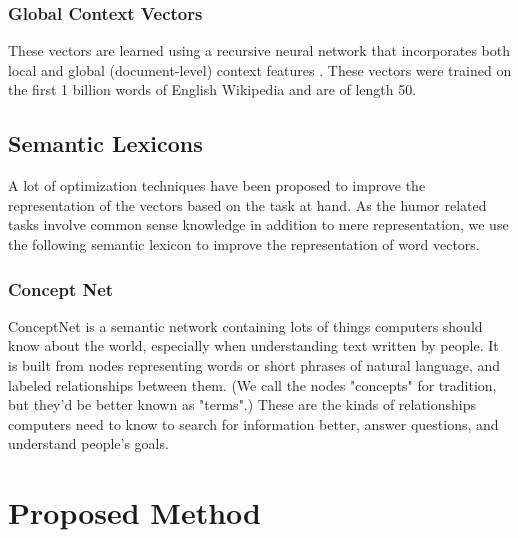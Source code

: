 \documentclass{acm_proc_article-sp}
\begin{document}
\subsubsection{Global Context Vectors}

These vectors are learned using a recursive neural network \cite{socher2011semi} that incorporates both local and global (document-level) context features \cite{maas2011learning}. These vectors were trained on the first 1 billion words of English Wikipedia and are of length 50.



\subsection{ Semantic Lexicons}

A lot of optimization techniques have been proposed to improve the representation of the vectors based on the task at hand. As the humor related tasks involve common sense knowledge in addition to mere representation, we use the following semantic lexicon to improve the representation of word vectors. 

\subsubsection{Concept Net }
ConceptNet is a semantic network containing lots of things computers should know about the world, especially when understanding text written by people.
It is built from nodes representing words or short phrases of natural language, and labeled relationships between them. (We call the nodes "concepts" for tradition, but they'd be better known as "terms".) These are the kinds of relationships computers need to know to search for information better, answer questions, and understand people's goals.

\section{Proposed Method}
\end{document}
